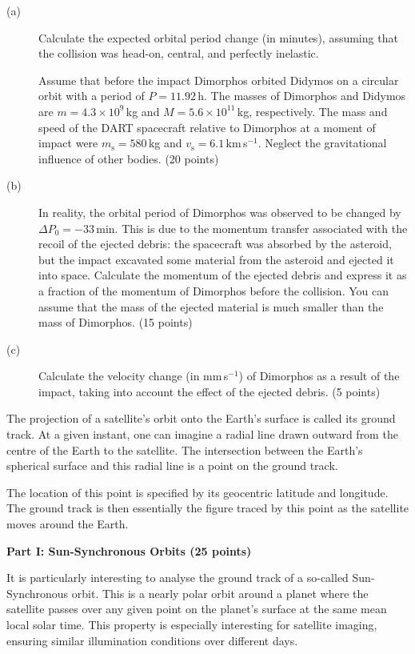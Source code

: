 \begin{description}
\item[(a)] Calculate the expected orbital period change (in minutes), assuming
  that the collision was head-on, central, and perfectly inelastic.

  Assume that before the impact Dimorphos orbited Didymos on a circular orbit
  with a period of $P = 11.92$\,h. The masses of Dimorphos and Didymos are
  $m = 4.3 \times 10^9$\,kg and $M = 5.6 \times 10^{11}$\,kg, respectively.
  The mass and speed of the DART spacecraft relative to Dimorphos at a moment
  of impact were $m_{\mathrm{s}} = 580$\,kg and
  $v_{\mathrm{s}} = 6.1$\,km\,s$^{-1}$. Neglect the gravitational influence of
  other bodies. \hfill(20 points)
\item[(b)] In reality, the orbital period of Dimorphos was observed to be
  changed by $\Delta P_0 = -33$\,min. This is due to the momentum transfer
  associated with the recoil of the ejected debris: the spacecraft was
  absorbed by the asteroid, but the impact excavated some material from the
  asteroid and ejected it into space. Calculate the momentum of the ejected
  debris and express it as a fraction of the momentum of Dimorphos before the
  collision. You can assume that the mass of the ejected material is much
  smaller than the mass of Dimorphos. \hfill(15 points)
\item[(c)] Calculate the velocity change (in mm\,s$^{-1}$) of Dimorphos as a
  result of the impact, taking into account the effect of the ejected debris.
  \hfill(5 points)
\end{description}

The projection of a satellite's orbit onto the Earth's surface is called its
ground track. At a given instant, one can imagine a radial line drawn outward
from the centre of the Earth to the satellite. The intersection between the
Earth's spherical surface and this radial line is a point on the ground track.

The location of this point is specified by its geocentric latitude and
longitude. The ground track is then essentially the figure traced by this
point as the satellite moves around the Earth.

\textbf{Part I: Sun-Synchronous Orbits (25 points)}

It is particularly interesting to analyse the ground track of a so-called
Sun-Synchronous orbit. This is a nearly polar orbit around a planet where the
satellite passes over any given point on the planet's surface at the same mean
local solar time. This property is especially interesting for satellite
imaging, ensuring similar illumination conditions over different days.

